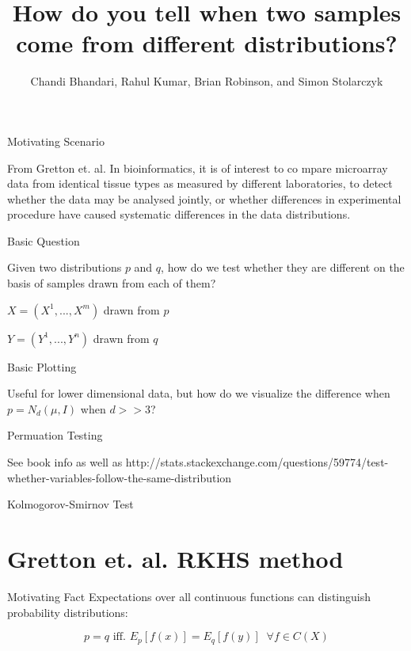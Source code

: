 \documentclass{beamer}
\begin{document}
\title[Two Sample Discrimination]{How do you tell when two samples come from different distributions? }
\author{Chandi Bhandari, Rahul Kumar, Brian Robinson, and Simon Stolarczyk}


\titlepage



\begin{frame}{Motivating Scenario}

\begin{block}{
From Gretton et. al.}
In bioinformatics,  it is of interest to co
mpare microarray
data from identical tissue types as measured by different laboratories, to
detect whether the data
may be analysed jointly, or whether differences in experimental procedure have caused systematic
differences in the data distributions.
\end{block}

\end{frame}


\begin{frame}{Basic Question}

Given two distributions $p$ and $q$, how do we test whether they are different on the basis of samples drawn from each of them?

$X = (X^1, ... , X^m)$ drawn from $p$

$Y = (Y^1, ..., Y^n)$ drawn from $q$

\end{frame}


\begin{frame}{Basic Plotting}

Useful for lower dimensional data, but how do we visualize the difference when $p = N_d(\mu, I)$ when $d >> 3$?

\end{frame}


\begin{frame}{Permuation Testing}

See book info as well as http://stats.stackexchange.com/questions/59774/test-whether-variables-follow-the-same-distribution

\end{frame}


\begin{frame}{Kolmogorov-Smirnov Test}

\end{frame}


\section{Gretton et. al. RKHS method}
\begin{frame}{Motivating Fact}
 Expectations over all continuous functions can distinguish probability distributions:
 
 $$p = q \text{ iff. }  E_p[f(x)] = E_q[f(y)] \;\; \forall f \in C(X)$$
\end{frame}
\end{document}

